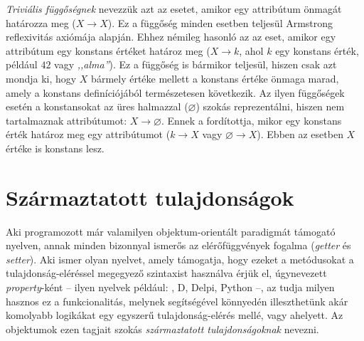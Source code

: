 \emph{Triviális függőségnek} nevezzük azt az esetet, amikor egy attribútum önmagát határozza meg ($X \rightarrow X$).
Ez a függőség minden esetben teljesül Armstrong reflexivitás axiómája alapján.
Ehhez némileg hasonló az az eset, amikor egy attribútum egy konstans értéket határoz meg ($X \rightarrow k$, ahol $k$ egy konstans érték, például $42$ vagy \textit{,,alma''}).
Ez a függőség is bármikor teljesül, hiszen csak azt mondja ki, hogy $X$ bármely értéke mellett a konstans értéke önmaga marad, amely a konstans definíciójából természetesen következik.
Az ilyen függőségek esetén a konstansokat az üres halmazzal ($\varnothing$) szokás reprezentálni, hiszen nem tartalmaznak attribútumot: $X \rightarrow \varnothing$.
Ennek a fordítottja, mikor egy konstans érték határoz meg egy attribútumot ($k \rightarrow X$ vagy $\varnothing \rightarrow X$).
Ebben az esetben $X$ értéke is konstans lesz.

\section{Származtatott tulajdonságok}

Aki programozott már valamilyen objektum-orientált paradigmát támogató nyelven, annak minden bizonnyal ismerős az elérőfüggvények fogalma (\emph{getter} és \emph{setter}).
Aki ismer olyan nyelvet, amely támogatja, hogy ezeket a metódusokat a tulajdonság-eléréssel megegyező szintaxist használva érjük el, úgynevezett \emph{property}-ként -- ilyen nyelvek például: \CSharp, D, Delpi, Python --, az tudja milyen hasznos ez a funkcionalitás, melynek segítségével könnyedén illeszthetünk akár komolyabb logikákat egy egyszerű tulajdonság-elérés mellé, vagy ahelyett.
Az objektumok ezen tagjait szokás \emph{származtatott tulajdonságoknak} nevezni.

